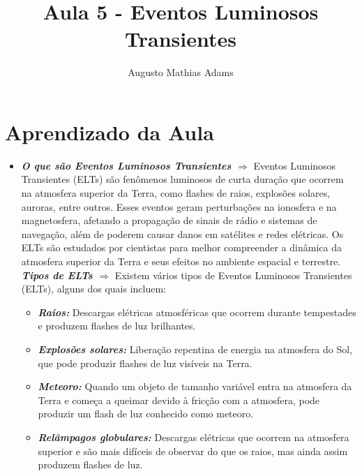 \documentclass[a4paper, 12pt, onecolumn,singlespacing]{article}
\title{Aula 5 - Eventos Luminosos Transientes}
\author[1]{Augusto Mathias Adams}
\affil[1]{augusto.adams@ufpr.br}
\begin{document}
	
	\maketitle
	
	\section{Aprendizado da Aula}
	
	\begin{itemize}
		\item \textbf{\textit{O que são Eventos Luminosos Transientes $\Rightarrow$ }}Eventos Luminosos Transientes (ELTs) são fenômenos luminosos de curta duração que ocorrem na atmosfera superior da Terra, como flashes de raios, explosões solares, auroras, entre outros. Esses eventos geram perturbações na ionosfera e na magnetosfera, afetando a propagação de sinais de rádio e sistemas de navegação, além de poderem causar danos em satélites e redes elétricas. Os ELTs são estudados por cientistas para melhor compreender a dinâmica da atmosfera superior da Terra e seus efeitos no ambiente espacial e terrestre.
		\subitem \textbf{\textit{Tipos de ELTs $\Rightarrow$ }}Existem vários tipos de Eventos Luminosos Transientes (ELTs), alguns dos quais incluem:
		\begin{itemize}
			\item \textbf{\textit{Raios:}} Descargas elétricas atmosféricas que ocorrem durante tempestades e produzem flashes de luz brilhantes.
			
			\item \textbf{\textit{Explosões solares:}} Liberação repentina de energia na atmosfera do Sol, que pode produzir flashes de luz visíveis na Terra.
			
			\item \textbf{\textit{Meteoro:}} Quando um objeto de tamanho variável entra na atmosfera da Terra e começa a queimar devido à fricção com a atmosfera, pode produzir um flash de luz conhecido como meteoro.
			
			\item \textbf{\textit{Relâmpagos globulares:}} Descargas elétricas que ocorrem na atmosfera superior e são mais difíceis de observar do que os raios, mas ainda assim produzem flashes de luz.
			

\end{itemize}
\end{itemize}
\end{document}
